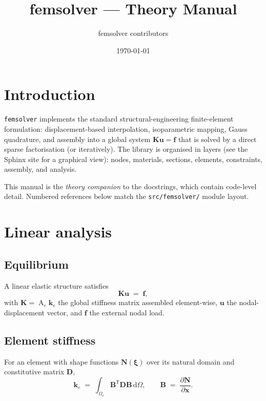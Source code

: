 \documentclass[11pt,a4paper]{report}
\title{femsolver --- Theory Manual}
\author{femsolver contributors}
\date{\today}
\newcommand{\bs}[1]{\boldsymbol{#1}}
\begin{document}
\maketitle
\tableofcontents
\clearpage

\chapter{Introduction}
\label{ch:introduction}

\texttt{femsolver} implements the standard structural-engineering
finite-element formulation: displacement-based interpolation,
isoparametric mapping, Gauss quadrature, and assembly into a global
system $\bs K \bs u = \bs f$ that is solved by a direct sparse
factorisation (or iteratively).  The library is organised in layers
(see the Sphinx site for a graphical view): nodes, materials,
sections, elements, constraints, assembly, and analysis.

This manual is the \emph{theory companion} to the docstrings, which
contain code-level detail.  Numbered references below match the
\texttt{src/femsolver/} module layout.

\chapter{Linear analysis}
\label{ch:linear}

\section{Equilibrium}

A linear elastic structure satisfies
\begin{equation}
  \bs K \bs u \;=\; \bs f,
  \label{eq:linear-static}
\end{equation}
with $\bs K = \mathop{\mathrm{A}}_e \bs k_e$ the global stiffness
matrix assembled element-wise, $\bs u$ the nodal-displacement
vector, and $\bs f$ the external nodal load.

\section{Element stiffness}

For an element with shape functions $\bs N(\bs \xi)$ over its
natural domain and constitutive matrix $\bs D$,
\begin{equation}
  \bs k_e \;=\; \int_{\Omega_e} \bs B^{\mathsf T} \bs D \bs B \, \mathrm{d}\Omega,
  \qquad
  \bs B \;=\; \frac{\partial \bs N}{\partial \bs x}.
  \label{eq:k-element}
\end{equation}
\end{document}

